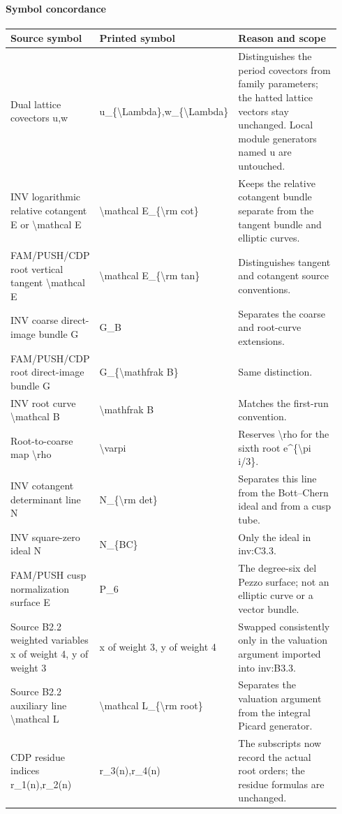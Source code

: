 \documentclass[11pt,a4paper]{article}
\theoremstyle{plain}
\theoremstyle{definition}
\begin{document}
\paragraph{Symbol concordance}
\begingroup\small\setlength{\tabcolsep}{3pt}\begin{longtable}{@{}L{0.24\linewidth}L{0.25\linewidth}L{0.45\linewidth}@{}}\toprule
Source symbol & Printed symbol & Reason and scope\\\midrule\endhead
Dual lattice covectors u,w & u\_\allowbreak{}\{\textbackslash{}Lambda\},w\_\allowbreak{}\{\textbackslash{}Lambda\} & Distinguishes the period covectors from family parameters; the hatted lattice vectors stay unchanged. Local module generators named u are untouched.\\
INV logarithmic relative cotangent E or \textbackslash{}mathcal E & \textbackslash{}mathcal E\_\allowbreak{}\{\textbackslash{}rm cot\} & Keeps the relative cotangent bundle separate from the tangent bundle and elliptic curves.\\
FAM/\allowbreak{}PUSH/\allowbreak{}CDP root vertical tangent \textbackslash{}mathcal E & \textbackslash{}mathcal E\_\allowbreak{}\{\textbackslash{}rm tan\} & Distinguishes tangent and cotangent source conventions.\\
INV coarse direct-image bundle G & G\_\allowbreak{}B & Separates the coarse and root-curve extensions.\\
FAM/\allowbreak{}PUSH/\allowbreak{}CDP root direct-image bundle G & G\_\allowbreak{}\{\textbackslash{}mathfrak B\} & Same distinction.\\
INV root curve \textbackslash{}mathcal B & \textbackslash{}mathfrak B & Matches the first-run convention.\\
Root-to-coarse map \textbackslash{}rho & \textbackslash{}varpi & Reserves \textbackslash{}rho for the sixth root e\textasciicircum{}\{\textbackslash{}pi i/\allowbreak{}3\}.\\
INV cotangent determinant line N & N\_\allowbreak{}\{\textbackslash{}rm det\} & Separates this line from the Bott--Chern ideal and from a cusp tube.\\
INV square-zero ideal N & N\_\allowbreak{}\{BC\} & Only the ideal in inv:\allowbreak{}C3.3.\\
FAM/\allowbreak{}PUSH cusp normalization surface E & P\_\allowbreak{}6 & The degree-six del Pezzo surface; not an elliptic curve or a vector bundle.\\
Source B2.2 weighted variables x of weight 4, y of weight 3 & x of weight 3, y of weight 4 & Swapped consistently only in the valuation argument imported into inv:\allowbreak{}B3.3.\\
Source B2.2 auxiliary line \textbackslash{}mathcal L & \textbackslash{}mathcal L\_\allowbreak{}\{\textbackslash{}rm root\} & Separates the valuation argument from the integral Picard generator.\\
CDP residue indices r\_\allowbreak{}1(n),r\_\allowbreak{}2(n) & r\_\allowbreak{}3(n),r\_\allowbreak{}4(n) & The subscripts now record the actual root orders; the residue formulas are unchanged.\\
\bottomrule\end{longtable}\endgroup
\end{document}
